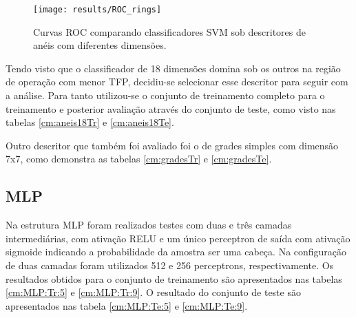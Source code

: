 \begin{table}
\end{table}

\begin{figure}
\centering
\texttt{[image: results/ROC\_rings]}
\caption{Curvas ROC comparando classificadores SVM sob descritores de anéis com diferentes dimensões.}
\label{fig:roc-rings}
\end{figure}

Tendo visto que o classificador de 18 dimensões domina sob os outros na região de operação com menor TFP, decidiu-se selecionar esse descritor para seguir com a análise. Para tanto utilizou-se o conjunto de treinamento completo para o treinamento e posterior avaliação através do conjunto de teste, como visto nas tabelas \ref{cm:aneis18Tr} e \ref{cm:aneis18Te}.

\begin{table}
\end{table}

Outro descritor que também foi avaliado foi o de grades simples com dimensão 7x7, como demonstra as tabelas \ref{cm:gradesTr} e \ref{cm:gradesTe}.

\begin{table}
\end{table}

\subsection{MLP}
Na estrutura MLP foram realizados testes com duas e três camadas intermediárias, com ativação RELU e um único perceptron de saída com ativação sigmoide indicando a probabilidade da amostra ser uma cabeça. Na configuração de duas camadas foram utilizados 512 e 256 perceptrons, respectivamente. Os resultados obtidos para o conjunto de treinamento são apresentados nas tabelas \ref{cm:MLP:Tr:5} e \ref{cm:MLP:Tr:9}. O resultado do conjunto de teste são apresentados nas tabela \ref{cm:MLP:Te:5} e \ref{cm:MLP:Te:9}.

